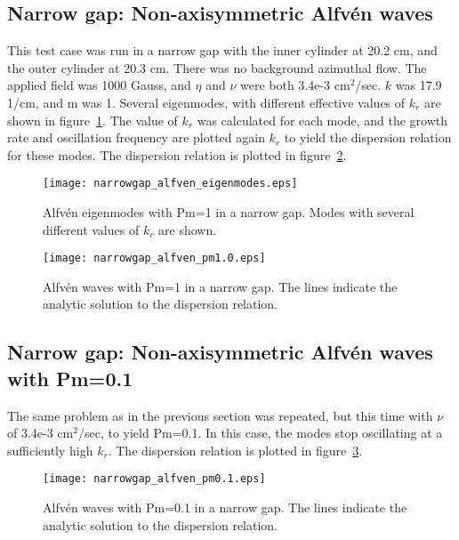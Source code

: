 \documentclass[letterpaper]{article}
\begin{document}
\subsection{Narrow gap: Non-axisymmetric Alfv\'en waves}

This test case was run in a narrow gap with the inner cylinder at 20.2
cm, and the outer cylinder at 20.3 cm.  There was no background
azimuthal flow.  The applied field was 1000 Gauss, and $\eta$ and
$\nu$ were both 3.4e-3 cm$^2$/sec.  $k$ was 17.9 1/cm, and m was 1.
Several eigenmodes, with different effective values of $k_r$ are shown
in figure~\ref{fig:narrowgapalfveneigenmodes}.  The value of $k_r$ was
calculated for each mode, and the growth rate and oscillation
frequency are plotted again $k_r$ to yield the dispersion relation for
these modes.  The dispersion relation is plotted in
figure~\ref{fig:narrowgapalfven}.

\begin{figure}
\begin{center}
\texttt{[image: narrowgap\_alfven\_eigenmodes.eps]}
\caption{Alfv\'en eigenmodes with Pm=1 in a narrow gap. Modes with
  several different values of $k_r$ are shown.}
\label{fig:narrowgapalfveneigenmodes}
\end{center}
\end{figure}

\begin{figure}
\begin{center}
\texttt{[image: narrowgap\_alfven\_pm1.0.eps]}
\caption{Alfv\'en waves with Pm=1 in a narrow gap.  The lines indicate
  the analytic solution to the dispersion relation.}
\label{fig:narrowgapalfven}
\end{center}
\end{figure}

\subsection{Narrow gap: Non-axisymmetric Alfv\'en waves with Pm=0.1}

The same problem as in the previous section was repeated, but this
time with $\nu$ of 3.4e-3 cm$^2$/sec, to yield Pm=0.1.  In this case,
the modes stop oscillating at a sufficiently high $k_r$.  The
dispersion relation is plotted in
figure~\ref{fig:narrowgapalfvenpm0.1}.

\begin{figure}
\begin{center}
\texttt{[image: narrowgap\_alfven\_pm0.1.eps]}
\caption{Alfv\'en waves with Pm=0.1 in a narrow gap.  The lines
  indicate the analytic solution to the dispersion relation.}
\label{fig:narrowgapalfvenpm0.1}
\end{center}
\end{figure}
\end{document}
